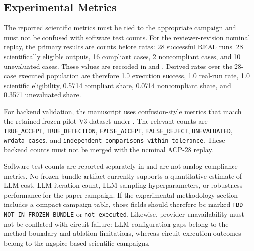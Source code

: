 \subsection{Experimental Metrics}
The reported scientific metrics must be tied to the appropriate campaign and must not be confused with software test counts. For the reviewer-revision nominal replay, the primary results are counts before rates: 28 successful REAL runs, 28 scientifically eligible outputs, 16 compliant cases, 2 noncompliant cases, and 10 unevaluated cases. These values are recorded in  and . Derived rates over the 28-case executed population are therefore 1.0 execution success, 1.0 real-run rate, 1.0 scientific eligibility, 0.5714 compliant share, 0.0714 noncompliant share, and 0.3571 unevaluated share.

For backend validation, the manuscript uses confusion-style metrics that match the retained frozen pilot V3 dataset under . The relevant counts are \texttt{TRUE\_ACCEPT}, \texttt{TRUE\_DETECTION}, \texttt{FALSE\_ACCEPT}, \texttt{FALSE\_REJECT}, \texttt{UNEVALUATED}, \texttt{wrdata\_cases}, and \texttt{independent\_comparisons\_within\_tolerance}. These backend counts must not be merged with the nominal ACP-28 replay.

Software test counts are reported separately in  and are not analog-compliance metrics. No frozen-bundle artifact currently supports a quantitative estimate of LLM cost, LLM iteration count, LLM sampling hyperparameters, or robustness performance for the paper campaign. If the experimental-methodology section includes a compact campaign table, those fields should therefore be marked \texttt{TBD -- NOT IN FROZEN BUNDLE} or \texttt{not executed}. Likewise, provider unavailability must not be conflated with circuit failure: LLM configuration gaps belong to the method boundary and ablation limitations, whereas circuit execution outcomes belong to the ngspice-based scientific campaigns.
